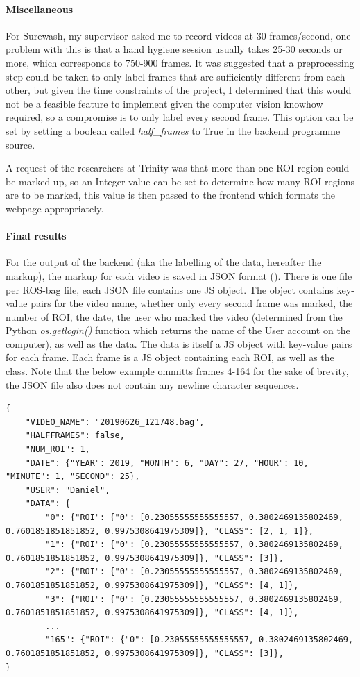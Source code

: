     \paragraph{Miscellaneous}
    For Surewash, my supervisor asked me to record videos at 30 frames/second, one problem with this is that a hand hygiene session usually takes 25-30 seconds or more, which corresponds to 750-900 frames. It was suggested that a preprocessing step could be taken to only label frames that are sufficiently different from each other, but given the time constraints of the project, I determined that this would not be a feasible feature to implement given the computer vision knowhow required, so a compromise is to only label every second frame. This option can be set by setting a boolean called {\slshape half\_frames} to True in the backend programme source.

    A request of the researchers at Trinity was that more than one ROI region could be marked up, so an Integer value can be set to determine how many ROI regions are to be marked, this value is then passed to the frontend which formats the webpage appropriately.

    \paragraph{Final results}
    For the output of the backend (aka the labelling of the data, hereafter the markup), the markup for each video is saved in JSON format (\cite{bray2017rfc}). There is one file per ROS-bag file, each JSON file contains one JS object. The object contains key-value pairs for the video name, whether only every second frame was marked, the number of ROI, the date, the user who marked the video (determined from the Python {\slshape os.getlogin()} function which returns the name of the User account on the computer), as well as the data. The data is itself a JS object with key-value pairs for each frame. Each frame is a JS object containing each ROI, as well as the class. Note that the below example ommitts frames 4-164 for the sake of brevity, the JSON file also does not contain any newline character sequences.

    \begin{lstlisting}[style=JSStyle]
{
    "VIDEO_NAME": "20190626_121748.bag", 
    "HALFFRAMES": false, 
    "NUM_ROI": 1, 
    "DATE": {"YEAR": 2019, "MONTH": 6, "DAY": 27, "HOUR": 10, "MINUTE": 1, "SECOND": 25}, 
    "USER": "Daniel", 
    "DATA": {
        "0": {"ROI": {"0": [0.23055555555555557, 0.3802469135802469, 0.7601851851851852, 0.9975308641975309]}, "CLASS": [2, 1, 1]},
        "1": {"ROI": {"0": [0.23055555555555557, 0.3802469135802469, 0.7601851851851852, 0.9975308641975309]}, "CLASS": [3]}, 
        "2": {"ROI": {"0": [0.23055555555555557, 0.3802469135802469, 0.7601851851851852, 0.9975308641975309]}, "CLASS": [4, 1]}, 
        "3": {"ROI": {"0": [0.23055555555555557, 0.3802469135802469, 0.7601851851851852, 0.9975308641975309]}, "CLASS": [4, 1]},
        ...
        "165": {"ROI": {"0": [0.23055555555555557, 0.3802469135802469, 0.7601851851851852, 0.9975308641975309]}, "CLASS": [3]},
}\end{lstlisting}


